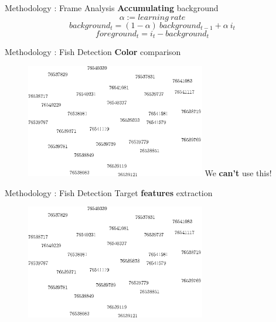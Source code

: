 \documentclass{beamer}
\begin{document}
\begin{frame}[c]{Methodology : Frame Analysis}
\center \textbf{Accumulating} background\\

$$
\alpha := learning\ rate
$$
$$
background_t = (1-\alpha)\ background_{t-1} + \alpha\ i_t
$$
$$
foreground_t = i_t - background_t
$$

\end{frame}


\begin{frame}[c]{Methodology : Fish Detection}
\center \textbf{Color} comparison\\
\begin{figure}[hbtp]
\centering
\includegraphics[width=0.7\textwidth]{fig/number/cloud}
\pause
\center We \textbf{can't} use this!
\end{figure}
\end{frame}

\begin{frame}[c]{Methodology : Fish Detection}
\center Target \textbf{features} extraction\\
\begin{figure}[hbtp]
\centering
\includegraphics[width=0.7\textwidth]{fig/number/cloud}
\end{figure}
\end{frame}
\end{document}
